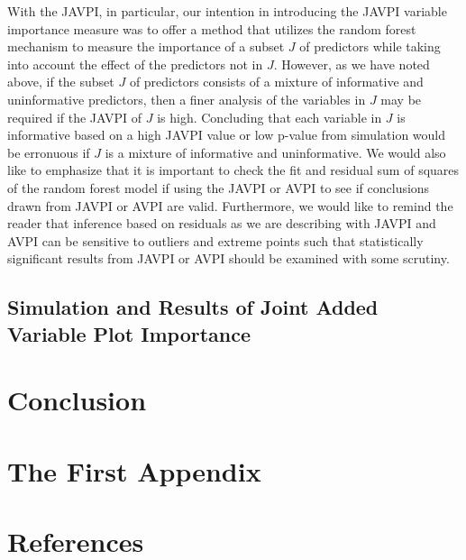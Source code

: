\documentclass[12pt,twoside]{reedthesis}
\theoremstyle{definition}
\theoremstyle{definition}
\theoremstyle{definition}
\theoremstyle{remark}
\begin{document}
With the JAVPI, in particular, our intention in introducing the JAVPI
variable importance measure was to offer a method that utilizes the
random forest mechanism to measure the importance of a subset \(J\) of
predictors while taking into account the effect of the predictors not in
\(J\). However, as we have noted above, if the subset \(J\) of
predictors consists of a mixture of informative and uninformative
predictors, then a finer analysis of the variables in \(J\) may be
required if the JAVPI of \(J\) is high. Concluding that each variable in
\(J\) is informative based on a high JAVPI value or low p-value from
simulation would be erronuous if \(J\) is a mixture of informative and
uninformative. We would also like to emphasize that it is important to
check the fit and residual sum of squares of the random forest model if
using the JAVPI or AVPI to see if conclusions drawn from JAVPI or AVPI
are valid. Furthermore, we would like to remind the reader that
inference based on residuals as we are describing with JAVPI and AVPI
can be sensitive to outliers and extreme points such that statistically
significant results from JAVPI or AVPI should be examined with some
scrutiny.

\section{Simulation and Results of Joint Added Variable Plot
Importance}\label{simulation-and-results-of-joint-added-variable-plot-importance}

\chapter*{Conclusion}\label{conclusion}

\appendix

\chapter{The First Appendix}\label{the-first-appendix}

\backmatter

\chapter*{References}\label{references}


\noindent
\end{document}
